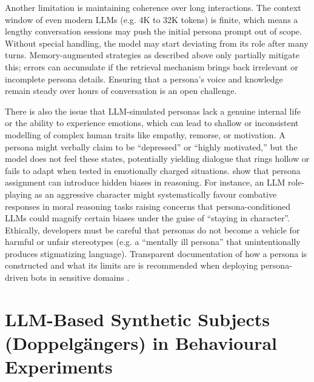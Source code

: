 Another limitation is maintaining coherence over long interactions. The context window of even modern LLMs (e.g. 4K to 32K tokens) is finite, which means a lengthy conversation sessions may push the initial persona prompt out of scope. Without special handling, the model may start deviating from its role after many turns. Memory-augmented strategies as described above only partially mitigate this; errors can accumulate if the retrieval mechanism brings back irrelevant or incomplete persona details. Ensuring that a persona's voice and knowledge remain steady over hours of conversation is an open challenge.

There is also the issue that LLM-simulated personas lack a genuine internal life or the ability to experience emotions, which can lead to shallow or inconsistent modelling of complex human traits like empathy, remorse, or motivation. A persona might verbally claim to be ``depressed'' or ``highly motivated,'' but the model does not feel these states, potentially yielding dialogue that rings hollow or fails to adapt when tested in emotionally charged situations. \cite{gupta-etal-2024-sociodemographic} show that persona assignment can introduce hidden biases in reasoning. For instance, an LLM role-playing as an aggressive character might systematically favour combative responses in moral reasoning tasks raising concerns that persona-conditioned LLMs could magnify certain biases under the guise of ``staying in character''. Ethically, developers must be careful that personas do not become a vehicle for harmful or unfair stereotypes (e.g. a “mentally ill persona” that unintentionally produces stigmatizing language). Transparent documentation of how a persona is constructed and what its limits are is recommended when deploying persona-driven bots in sensitive domains \cite{smith-etal-2020-mitigating}. 




\section{LLM-Based Synthetic Subjects (Doppelgängers) in Behavioural Experiments}
\label{sec:background_synthetic_validation}


